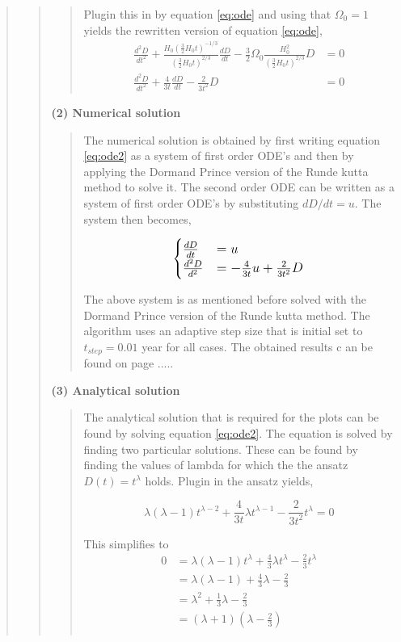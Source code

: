 \begin{quote}
\begin{quote}
\begin{quote}
Plugin this in by equation \ref{eq:ode} and using that $\Omega_0 = 1$  yields the rewritten version of equation \ref{eq:ode},
\begin{align}
\frac{d^2D}{dt^2} + \frac{H_0 \left(\frac{3}{2} H_0 t \right)^{-1/3}}{\left(\frac{3}{2} H_0 t \right)^{2/3}} \frac{dD}{dt} - \frac{3}{2} \Omega_0 \frac{H_0^2}{\left(\frac{3}{2} H_0 t \right)^{2/3}}D &= 0 \\
\frac{d^2D}{dt^2} + \frac{4}{3t} \frac{dD}{dt} - \frac{2}{3t^2}D &= 0
\label{eq:ode2}
\end{align}
\end{quote}

\textbf{(2) Numerical solution}
\begin{quote}
The numerical solution is obtained by first writing equation \ref{eq:ode2} as a system of first order ODE's and then by applying the Dormand\- Prince version of the Runde kutta method to solve it. The second order ODE  can be written as a system of first order ODE's by substituting $dD/dt = u$. The system then becomes,

\begin{equation}
\large
\begin{cases} 
\frac{dD}{dt} &= u \\ 
\frac{d^2D}{d^2} &= - \frac{4}{3t}u + \frac{2}{3t^2}D 
\end{cases}
\end{equation}

The above system is as mentioned before solved with the Dormand\- Prince version of the Runde kutta method. The algorithm uses an adaptive step size that is initial set to $t_{step} = 0.01$ year for all cases. The obtained results c an be found on page .....
\end{quote}

\textbf{(3) Analytical solution}
\begin{quote}
The analytical solution that is required for the plots can be found by solving equation \ref{eq:ode2}. The equation is solved by finding two particular solutions. These can be found by finding the values of lambda for which the the ansatz $D(t) = t^{\lambda}$ holds. Plugin in the ansatz yields,

\begin{equation}
\lambda \left(\lambda -1 \right) t^{\lambda - 2} + \frac{4}{3t} \lambda t^{\lambda -1} - \frac{2}{3t^2}t^{\lambda} = 0
\end{equation}

This simplifies to
\begin{align*}
0 & = \lambda \left( \lambda -1 \right) t^{\lambda} + \frac{4}{3} \lambda t^{\lambda} - \frac{2}{3} t^{\lambda}  \\
&= \lambda ( \lambda -1 ) + \frac{4}{3} \lambda - \frac{2}{3}  \\
&= \lambda^2 + \frac{1}{3} \lambda - \frac{2}{3} \\
&= (\lambda + 1) (\lambda - \frac{2}{3} )  \\
\end{align*}


\end{quote}
\end{quote}
\end{quote}
